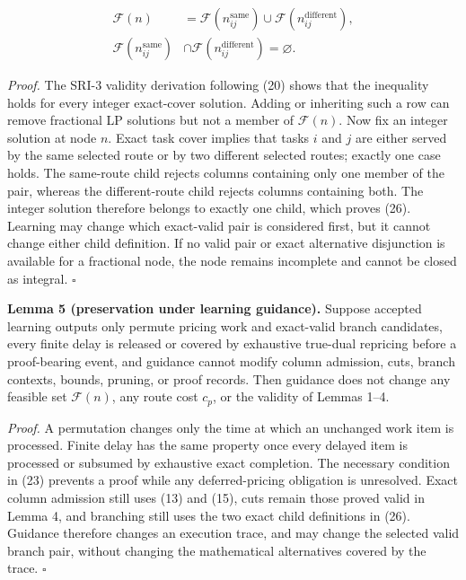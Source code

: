 \documentclass[
  11pt,
]{article}
\begin{document}
\[
\begin{aligned}
\mathcal{F}(n)
&=\mathcal{F}\!\left(n^{\mathrm{same}}_{ij}\right)
\cup
\mathcal{F}\!\left(n^{\mathrm{different}}_{ij}\right),\\
\mathcal{F}\!\left(n^{\mathrm{same}}_{ij}\right)
&\cap
\mathcal{F}\!\left(n^{\mathrm{different}}_{ij}\right)
=\varnothing .
\end{aligned}
\tag{26}
\]

\emph{Proof.} The SRI-3 validity derivation following (20) shows that
the inequality holds for every integer exact-cover solution. Adding or
inheriting such a row can remove fractional LP solutions but not a
member of \(\mathcal{F}(n)\). Now fix an integer solution at node \(n\).
Exact task cover implies that tasks \(i\) and \(j\) are either served by
the same selected route or by two different selected routes; exactly one
case holds. The same-route child rejects columns containing only one
member of the pair, whereas the different-route child rejects columns
containing both. The integer solution therefore belongs to exactly one
child, which proves (26). Learning may change which exact-valid pair is
considered first, but it cannot change either child definition. If no
valid pair or exact alternative disjunction is available for a
fractional node, the node remains incomplete and cannot be closed as
integral. \(\square\)

\textbf{Lemma 5 (preservation under learning guidance).} Suppose
accepted learning outputs only permute pricing work and exact-valid
branch candidates, every finite delay is released or covered by
exhaustive true-dual repricing before a proof-bearing event, and
guidance cannot modify column admission, cuts, branch contexts, bounds,
pruning, or proof records. Then guidance does not change any feasible
set \(\mathcal{F}(n)\), any route cost \(c_p\), or the validity of
Lemmas 1--4.

\emph{Proof.} A permutation changes only the time at which an unchanged
work item is processed. Finite delay has the same property once every
delayed item is processed or subsumed by exhaustive exact completion.
The necessary condition in (23) prevents a proof while any
deferred-pricing obligation is unresolved. Exact column admission still
uses (13) and (15), cuts remain those proved valid in Lemma 4, and
branching still uses the two exact child definitions in (26). Guidance
therefore changes an execution trace, and may change the selected valid
branch pair, without changing the mathematical alternatives covered by
the trace. \(\square\)
\end{document}
